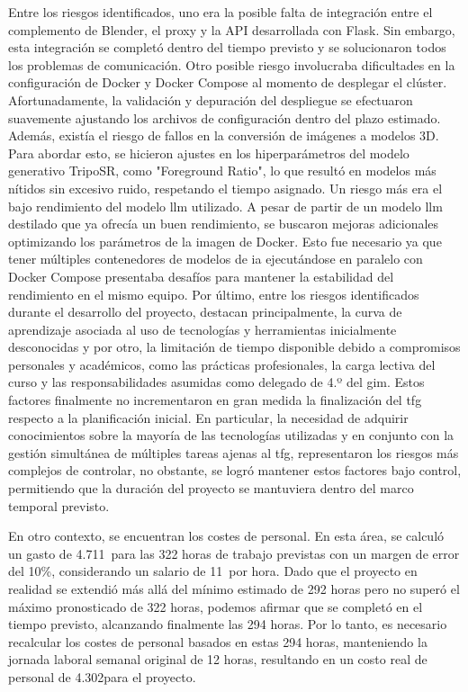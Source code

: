 Entre los riesgos identificados, uno era la posible falta de integración entre el complemento de Blender, el proxy y la API desarrollada con Flask. Sin embargo, esta integración se completó dentro del tiempo previsto y se solucionaron todos los problemas de comunicación. Otro posible riesgo involucraba dificultades en la configuración de Docker y Docker Compose al momento de desplegar el clúster. Afortunadamente, la validación y depuración del despliegue se efectuaron suavemente ajustando los archivos de configuración dentro del plazo estimado. Además, existía el riesgo de fallos en la conversión de imágenes a modelos 3D. Para abordar esto, se hicieron ajustes en los hiperparámetros del modelo generativo TripoSR, como "Foreground Ratio", lo que resultó en modelos más nítidos sin excesivo ruido, respetando el tiempo asignado. Un riesgo más era el bajo rendimiento del modelo \gls{llm} utilizado. A pesar de partir de un modelo \gls{llm} destilado que ya ofrecía un buen rendimiento, se buscaron mejoras adicionales optimizando los parámetros de la imagen de Docker. Esto fue necesario ya que tener múltiples contenedores de modelos de \gls{ia} ejecutándose en paralelo con Docker Compose presentaba desafíos para mantener la estabilidad del rendimiento en el mismo equipo. Por último, entre los riesgos identificados durante el desarrollo del proyecto, destacan principalmente, la curva de aprendizaje asociada al uso de tecnologías y herramientas inicialmente desconocidas y por otro, la limitación de tiempo disponible debido a compromisos personales y académicos, como las prácticas profesionales, la carga lectiva del curso y las responsabilidades asumidas como delegado de 4.º del \gls{gim}. Estos factores finalmente no incrementaron en gran medida la finalización del \gls{tfg} respecto a la planificación inicial. En particular, la necesidad de adquirir conocimientos sobre la mayoría de las tecnologías utilizadas y en conjunto con la gestión simultánea de múltiples tareas ajenas al \gls{tfg}, representaron los riesgos más complejos de controlar, no obstante, se logró mantener estos factores bajo control, permitiendo que la duración del proyecto se mantuviera dentro del marco temporal previsto.

En otro contexto, se encuentran los costes de personal. En esta área, se calculó un gasto de 4.711\texteuro\ para las 322 horas de trabajo previstas con un margen de error del 10\%, considerando un salario de 11\texteuro\ por hora. Dado que el proyecto en realidad se extendió más allá del mínimo estimado de 292 horas pero no superó el máximo pronosticado de 322 horas, podemos afirmar que se completó en el tiempo previsto, alcanzando finalmente las 294 horas. Por lo tanto, es necesario recalcular los costes de personal basados en estas 294 horas, manteniendo la jornada laboral semanal original de 12 horas, resultando en un costo real de personal de 4.302\texteuro para el proyecto.

